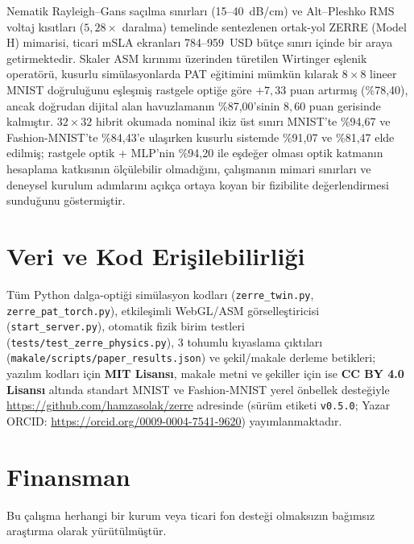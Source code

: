 \documentclass[journal]{IEEEtran}
\begin{document}
Nematik Rayleigh--Gans sa\c{c}\i{}lma s\i{}n\i{}rlar\i{} (15--40~dB/cm) ve Alt--Pleshko RMS voltaj k\i{}s\i{}tlar\i{} ($5{,}28\times$ daralma) temelinde sentezlenen ortak-yol ZERRE (Model H) mimarisi, ticari mSLA ekranlar\i{} 784--959~USD b\"ut\c{c}e s\i{}n\i{}r\i{} i\c{c}inde bir araya getirmektedir. Skaler ASM k\i{}r\i{}n\i{}m\i{} \"uzerinden t\"uretilen Wirtinger e\c{s}lenik operat\"or\"u, kusurlu sim\"ulasyonlarda PAT e\u{g}itimini m\"umk\"un k\i{}larak $8\times 8$ lineer MNIST do\u{g}rulu\u{g}unu e\c{s}le\c{s}mi\c{s} rastgele opti\u{g}e g\"ore $+7{,}33$ puan art\i{}rm\i{}\c{s} (\%78,40), ancak do\u{g}rudan dijital alan havuzlaman\i{}n \%87,00'sinin $8{,}60$ puan gerisinde kalm\i{}\c{s}t\i{}r. $32\times 32$ hibrit okumada nominal ikiz \"ust s\i{}n\i{}r\i{} MNIST'te \%94,67 ve Fashion-MNIST'te \%84,43'e ula\c{s}\i{}rken kusurlu sistemde \%91,07 ve \%81,47 elde edilmi\c{s}; rastgele optik + MLP'nin \%94,20 ile e\c{s}de\u{g}er olmas\i{} optik katman\i{}n hesaplama katk\i{}s\i{}n\i{}n \"ol\c{c}\"ulebilir olmad\i{}\u{g}\i{}n\i{}, \c{c}al\i{}\c{s}man\i{}n mimari s\i{}n\i{}rlar\i{} ve deneysel kurulum ad\i{}mlar\i{}n\i{} a\c{c}\i{}k\c{c}a ortaya koyan bir fizibilite de\u{g}erlendirmesi sundu\u{g}unu g\"ostermi\c{s}tir.

\section*{Veri ve Kod Eri\c{s}ilebilirli\u{g}i}
T\"um Python dalga-opti\u{g}i sim\"ulasyon kodlar\i{} (\texttt{zerre\_twin.py}, \texttt{zerre\_pat\_torch.py}), etkile\c{s}imli WebGL/ASM g\"orselle\c{s}tiricisi (\texttt{start\_server.py}), otomatik fizik birim testleri (\texttt{tests/test\_zerre\_physics.py}), 3 tohumlu k\i{}yaslama \c{c}\i{}kt\i{}lar\i{} (\texttt{makale/scripts/paper\_results.json}) ve \c{s}ekil/makale derleme betikleri; yaz\i{}l\i{}m kodlar\i{} i\c{c}in \textbf{MIT Lisans\i{}}, makale metni ve \c{s}ekiller i\c{c}in ise \textbf{CC BY 4.0 Lisans\i{}} alt\i{}nda standart MNIST ve Fashion-MNIST yerel \"onbellek deste\u{g}iyle \url{https://github.com/hamzasolak/zerre} adresinde (s\"ur\"um etiketi \texttt{v0.5.0}; Yazar ORCID: \url{https://orcid.org/0009-0004-7541-9620}) yay\i{}mlanmaktad\i{}r.

\section*{Finansman}
Bu \c{c}al\i{}\c{s}ma herhangi bir kurum veya ticari fon deste\u{g}i olmaks\i{}z\i{}n ba\u{g}\i{}ms\i{}z ara\c{s}t\i{}rma olarak y\"ur\"ut\"ulm\"u\c{s}t\"ur.
\end{document}
